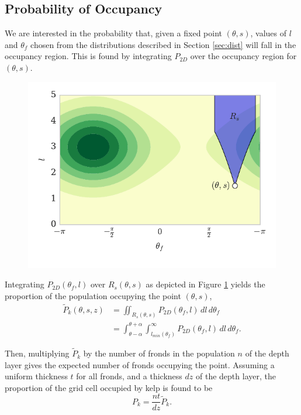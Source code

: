 \documentclass[ms,cpyr,lof,lot]{uathesis}
\begin{document}
\subsection{Probability of Occupancy}
We are interested in the probability that, given a fixed point $(\theta,s)$, values of $l$ and $\theta_f$ chosen from the distributions described in Section \ref{sec:dist} will fall in the occupancy region.
This is found by integrating $P_{2D}$ over the occupancy region for $(\theta,s)$.

\begin{figure}[H]
	\centering
	\includegraphics[width=.75\linewidth]{cart_shade}
	\vspace{-3em}
	\label{fig:cart_shade}
\end{figure}

Integrating $P_{2D}(\theta_f,l)$ over $R_s(\theta,s)$ as depicted in Figure \ref{fig:cart_shade} yields the proportion of the population occupying the point $(\theta,s)$,
\begin{align*}
		\tilde{P}_k(\theta,s,z)	&= \iint_{R_s(\theta,s)}
								P_{2D}(\theta_f,l)
								\,dl\,d\theta_f \nonumber \\
							&= \int_{\theta-\alpha}^{\theta+\alpha} 
								\int_{l_{min}(\theta_f)}^\infty
								P_{2D}(\theta_f,l)
								\,dl\,d\theta_f.
\end{align*}

Then, multiplying $\tilde{P}_k$ by the number of fronds in the population $n$ of the depth layer gives the expected number of fronds occupying the point.
Assuming a uniform thickness $t$ for all fronds, and a thickness $dz$ of the depth layer, the proportion of the grid cell occupied by kelp is found to be
\begin{equation*}
  P_k = \frac{nt}{dz}\tilde{P}_k.
\end{equation*}
\end{document}
